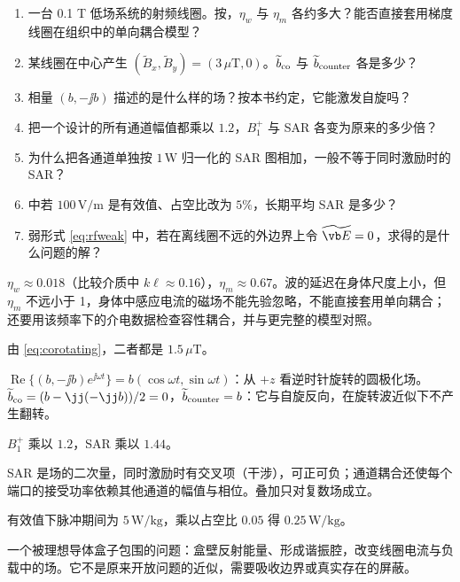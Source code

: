\begin{selfcheck}
\begin{enumerate}
\item 一台 0.1 T 低场系统的射频线圈。按，$\eta_w$ 与 $\eta_m$ 各约多大？能否直接套用梯度线圈在组织中的单向耦合模型？
\item 某线圈在中心产生 $(\widetilde B_x,\widetilde B_y)=(3\,\mu\mathrm T,0)$。$\widetilde b_{\rm co}$ 与 $\widetilde b_{\rm counter}$ 各是多少？
\item 相量 $(b,-\jj b)$ 描述的是什么样的场？按本书约定，它能激发自旋吗？
\item 把一个设计的所有通道幅值都乘以 $1.2$，$B_1^+$ 与 SAR 各变为原来的多少倍？
\item 为什么把各通道单独按 $1\,\mathrm W$ 归一化的 SAR 图相加，一般不等于同时激励时的 SAR？
\item {} 中若 $100\,\mathrm{V/m}$ 是有效值、占空比改为 $5\%$，长期平均 SAR 是多少？
\item 弱形式 \eqref{eq:rfweak} 中，若在离线圈不远的外边界上令 $\widetilde{\vb E}=0$，求得的是什么问题的解？
\end{enumerate}
\end{selfcheck}

\begin{answers}
\item $\eta_w\approx0.018$（比较介质中 $k\ell\approx0.16$），$\eta_m\approx0.67$。波的延迟在身体尺度上小，但 $\eta_m$ 不远小于 1，身体中感应电流的磁场不能先验忽略，不能直接套用单向耦合；还要用该频率下的介电数据检查容性耦合，并与更完整的模型对照。
\item 由 \eqref{eq:corotating}，二者都是 $1.5\,\mu\mathrm T$。
\item $\operatorname{Re}\{(b,-\jj b)e^{\jj\omega t}\}=b(\cos\omega t,\sin\omega t)$：从 $+z$ 看逆时针旋转的圆极化场。$\widetilde b_{\rm co}=(b-\jj(-\jj b))/2=0$，$\widetilde b_{\rm counter}=b$：它与自旋反向，在旋转波近似下不产生翻转。
\item $B_1^+$ 乘以 $1.2$，SAR 乘以 $1.44$。
\item SAR 是场的二次量，同时激励时有交叉项（干涉），可正可负；通道耦合还使每个端口的接受功率依赖其他通道的幅值与相位。叠加只对复数场成立。
\item 有效值下脉冲期间为 $5\,\mathrm{W/kg}$，乘以占空比 $0.05$ 得 $0.25\,\mathrm{W/kg}$。
\item 一个被理想导体盒子包围的问题：盒壁反射能量、形成谐振腔，改变线圈电流与负载中的场。它不是原来开放问题的近似，需要吸收边界或真实存在的屏蔽。
\end{answers}
